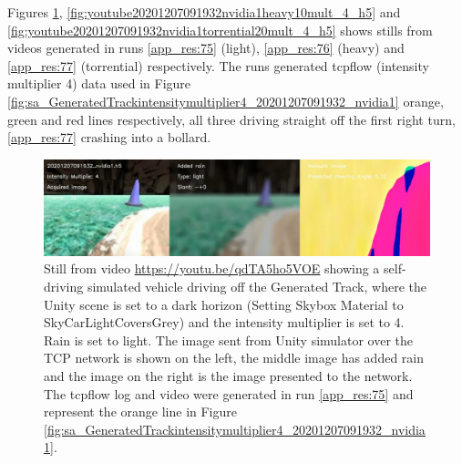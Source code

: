 
Figures \ref{fig:youtube20201207091932nvidia1lightrainmult_4_h5}, \ref{fig:youtube20201207091932nvidia1heavy10mult_4_h5} and  \ref{fig:youtube20201207091932nvidia1torrential20mult_4_h5} shows stills from videos generated in runs \ref{app_res:75} (light), \ref{app_res:76} (heavy) and \ref{app_res:77} (torrential) respectively. The runs generated tcpflow (intensity multiplier 4) data used in Figure \ref{fig:sa_GeneratedTrackintensitymultiplier4_20201207091932_nvidia1} orange, green and red lines respectively, all three driving straight off the first right turn, \ref{app_res:77} crashing into a bollard.


\begin{figure}[h!]
 \centering 
 \includegraphics[width=\textwidth]{Figures/youtube20201207091932nvidia1lightrainmult_4_h5.png}
 \caption{Still from video \url{https://youtu.be/qdTA5ho5VOE} showing a self-driving simulated vehicle driving off the Generated Track, where the Unity scene is set to a dark horizon (Setting Skybox Material to SkyCarLightCoversGrey) and the intensity multiplier is set to 4. Rain is set to light. The image sent from Unity simulator over the TCP network is shown on the left, the middle image has added rain and the image on the right is the image presented to the network. The tcpflow log and video were generated in run \ref{app_res:75} and represent the orange line in Figure \ref{fig:sa_GeneratedTrackintensitymultiplier4_20201207091932_nvidia1}.}
 \label{fig:youtube20201207091932nvidia1lightrainmult_4_h5} 
\end{figure}


